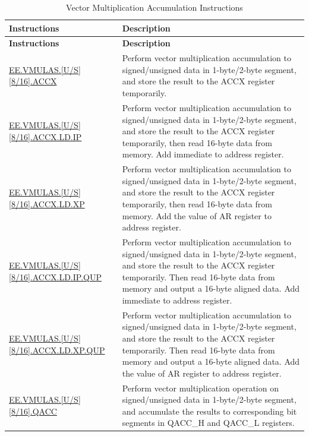 \begin{longtable}[c]{|l|m{9cm}|}
    \caption{Vector Multiplication Accumulation Instructions}
    \label{tab:pie-mula-instructions}\\
    \hline
    \rowcolor{lightgray}
    \textbf{Instructions} & \textbf{Description} \\\hline
    \endfirsthead
    \rowcolor{lightgray}
    \textbf{Instructions} & \textbf{Description} \\\hline
    \endhead
    \endfoot
    
    \hyperref[instruction:EEVMULASU8ACCX]{EE.VMULAS.[U/S][8/16].ACCX} & Perform vector multiplication accumulation to signed/unsigned data in 1-byte/2-byte segment, and store the result to the ACCX register temporarily.
    \\\hline
    \hyperref[instruction:EEVMULASU8ACCXLDIP]{EE.VMULAS.[U/S][8/16].ACCX.LD.IP} & Perform vector multiplication accumulation to signed/unsigned data in 1-byte/2-byte segment, and store the result to the ACCX register temporarily, then read 16-byte data from memory. Add immediate to address register.
    \\\hline
    \hyperref[instruction:EEVMULASU8ACCXLDXP]{EE.VMULAS.[U/S][8/16].ACCX.LD.XP} & Perform vector multiplication accumulation to signed/unsigned data in 1-byte/2-byte segment, and store the result to the ACCX register temporarily, then read 16-byte data from memory. Add the value of AR register to address register.
    \\\hline
    \hyperref[instruction:EEVMULASU8ACCXLDIPQUP]{EE.VMULAS.[U/S][8/16].ACCX.LD.IP.QUP} & Perform vector multiplication accumulation to signed/unsigned data in 1-byte/2-byte segment, and store the result to the ACCX register temporarily. Then read 16-byte data from memory and output a 16-byte aligned data. Add immediate to address register.
    \\\hline
    \hyperref[instruction:EEVMULASU8ACCXLDXPQUP]{EE.VMULAS.[U/S][8/16].ACCX.LD.XP.QUP} & Perform vector multiplication accumulation to signed/unsigned data in 1-byte/2-byte segment, and store the result to the ACCX register temporarily. Then read 16-byte data from memory and output a 16-byte aligned data. Add the value of AR register to address register.
    \\\hline
    \hyperref[instruction:EEVMULASU8QACC]{EE.VMULAS.[U/S][8/16].QACC} & Perform vector multiplication operation on signed/unsigned data in 1-byte/2-byte segment, and accumulate the results to corresponding bit segments in QACC\_H and QACC\_L registers.

\end{longtable}
